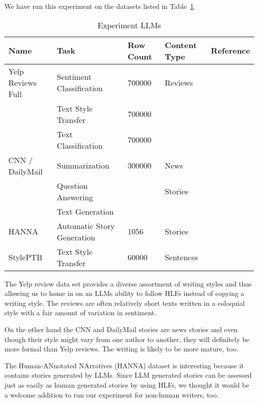 \documentclass[runningheads,a4paper,11pt]{article}
\begin{document}
We have run this experiment on the datasets listed in Table~\ref{table-ds}.

\begin{table}[ht]
    \setlength\tabcolsep{6pt}
    \centering
    \begin{tabular}{@{}lllll@{}}\toprule
        Name              & Task                       & Row Count & Content Type & Reference                     \\ \toprule
        Yelp Reviews Full & Sentiment Classification   & 700000    & Reviews      & \cite{yelp2015neurips}        \\
                          & Text Style Transfer        & 700000    &              &                               \\
                          & Text Classification        & 700000    &              &                               \\ \midrule
        CNN / DailyMail   & Summarization              & 300000    & News         & \cite{cnndm2015}              \\
                          & Question Answering         &           & Stories      & \cite{cnndm2017}              \\
                          & Text Generation            &           &              &                               \\ \midrule
        HANNA             & Automatic Story Generation & 1056      & Stories      & \cite{hanna2024}              \\ \midrule
        StylePTB          & Text Style Transfer        & 60000     & Sentences    & \cite{lyu-etal-2021-styleptb} \\ \bottomrule
    \end{tabular}
    \caption{Experiment LLMs}\label{table-ds}
\end{table}

The Yelp review data set provides a diverse assortment of writing styles and
thus allowing us to home in on an LLMs ability to follow HLFs instead of copying
a writing style.
The reviews are often relatively short texts written in a coloquial style with
a fair amount of variation in sentiment.

On the other hand the CNN and DailyMail stories are news stories and even though
their style might vary from one author to another, they will definitely be more
formal than Yelp reviews.
The writing is likely to be more mature, too.

The Human-ANnotated NArratives (HANNA) dataset is interesting because it
contains stories generated by LLMs. Since LLM generated stories can be assessed
just as easily as human generated stories by using HLFs, we thought it would be
a welcome addition to run our experiment for non-human writers, too.
\end{document}
